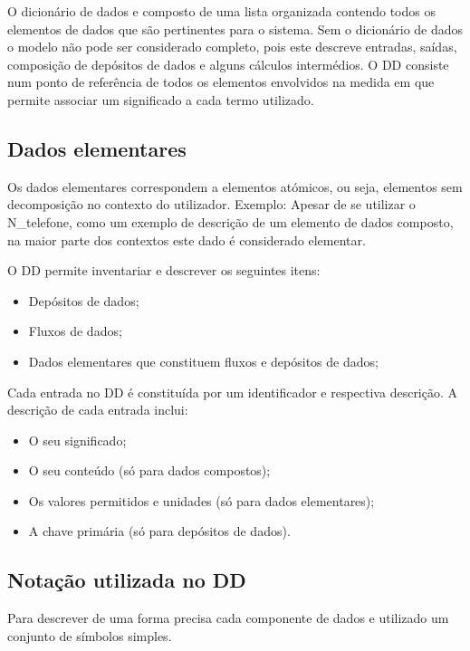 \documentclass[12pt,a4paper]{article}
\begin{document}
O dicionário de dados e composto de uma lista organizada contendo todos os elementos de dados que são pertinentes para o sistema. Sem o dicionário de dados o modelo não pode ser considerado completo, pois este descreve entradas, saídas, composição de depósitos de dados e alguns cálculos intermédios. O DD consiste num ponto de referência de todos os elementos envolvidos na medida em que permite associar um significado a cada termo utilizado.


\subsection{Dados elementares}
Os dados elementares correspondem a elementos atómicos, ou seja, elementos sem decomposição no contexto do utilizador.
Exemplo: Apesar de se utilizar o N\_telefone, como um exemplo de descrição de um elemento de dados composto, na maior parte dos contextos este dado é considerado elementar.

O DD permite inventariar e descrever os seguintes itens:
\begin{itemize}
	\item Depósitos de dados;
	\item Fluxos de dados;
	\item Dados elementares que constituem fluxos e depósitos de dados;
\end{itemize}
Cada entrada no DD é constituída por um identificador e respectiva descrição. A descrição de cada entrada inclui:


\begin{itemize}
	\item O seu significado;
	\item O seu conteúdo (só para dados compostos);
	\item Os valores permitidos e unidades (só para dados elementares);
	\item A chave primária (só para depósitos de dados).
\end{itemize}

\subsection{Notação utilizada no DD}

Para descrever de uma forma precisa cada componente de dados e utilizado um conjunto de símbolos simples.
\end{document}
